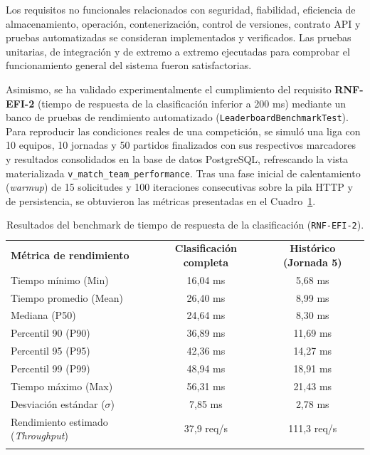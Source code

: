 Los requisitos no funcionales relacionados con seguridad, fiabilidad, eficiencia de almacenamiento, operación, contenerización, control de versiones, contrato API y pruebas automatizadas se consideran implementados y verificados. Las pruebas unitarias, de integración y de extremo a extremo ejecutadas para comprobar el funcionamiento general del sistema fueron satisfactorias.

Asimismo, se ha validado experimentalmente el cumplimiento del requisito \textbf{RNF-EFI-2} (tiempo de respuesta de la clasificación inferior a 200 ms) mediante un banco de pruebas de rendimiento automatizado (\texttt{LeaderboardBenchmarkTest}). Para reproducir las condiciones reales de una competición, se simuló una liga con 10 equipos, 10 jornadas y 50 partidos finalizados con sus respectivos marcadores y resultados consolidados en la base de datos PostgreSQL, refrescando la vista materializada \texttt{v\_match\_team\_performance}. Tras una fase inicial de calentamiento (\emph{warmup}) de 15 solicitudes y 100 iteraciones consecutivas sobre la pila HTTP y de persistencia, se obtuvieron las métricas presentadas en el Cuadro~\ref{tab:benchmark_leaderboard}.

\begin{table}[H]
	\centering
	\renewcommand{\arraystretch}{1.25}
	\begin{tabularx}{\textwidth}{>{\RaggedRight\arraybackslash}X c c}
			\textbf{Métrica de rendimiento} & \textbf{Clasificación completa} & \textbf{Histórico (Jornada 5)} \\ \lightrule
		Tiempo mínimo (Min) & 16,04 ms & 5,68 ms \\ \lightrule
		Tiempo promedio (Mean) & 26,40 ms & 8,99 ms \\ \lightrule
		Mediana (P50) & 24,64 ms & 8,30 ms \\ \lightrule
		Percentil 90 (P90) & 36,89 ms & 11,69 ms \\ \lightrule
		Percentil 95 (P95) & 42,36 ms & 14,27 ms \\ \lightrule
		Percentil 99 (P99) & 48,94 ms & 18,91 ms \\ \lightrule
		Tiempo máximo (Max) & 56,31 ms & 21,43 ms \\ \lightrule
		Desviación estándar ($\sigma$) & 7,85 ms & 2,78 ms \\ \lightrule
		Rendimiento estimado (\emph{Throughput}) & 37,9 req/s & 111,3 req/s \\ \lightrule
	\end{tabularx}
	\caption{Resultados del benchmark de tiempo de respuesta de la clasificación (\texttt{RNF-EFI-2}).}
	\label{tab:benchmark_leaderboard}
\end{table}

